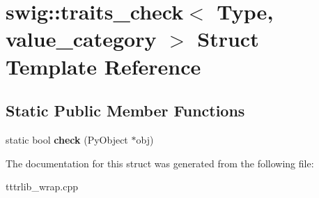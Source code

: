 \hypertarget{structswig_1_1traits__check_3_01_type_00_01value__category_01_4}{}\section{swig\+:\+:traits\+\_\+check$<$ Type, value\+\_\+category $>$ Struct Template Reference}
\label{structswig_1_1traits__check_3_01_type_00_01value__category_01_4}
\subsection*{Static Public Member Functions}
\begin{DoxyCompactItemize}
\item 
\mbox{\label{structswig_1_1traits__check_3_01_type_00_01value__category_01_4_a7b6a0811d1ac4cb4038c2eb8305411d0}} 
static bool {\bfseries check} (Py\+Object $\ast$obj)
\end{DoxyCompactItemize}


The documentation for this struct was generated from the following file\+:\begin{DoxyCompactItemize}
\item 
tttrlib\+\_\+wrap.\+cpp\end{DoxyCompactItemize}

